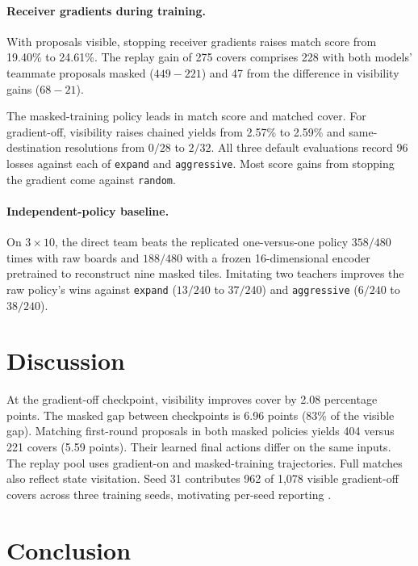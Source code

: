 \documentclass{article}
\begin{document}
\paragraph{Receiver gradients during training.}
With proposals visible, stopping receiver gradients raises match score from 19.40\% to 24.61\%. The replay gain of 275 covers comprises 228 with both models' teammate proposals masked (\(449-221\)) and 47 from the difference in visibility gains (\(68-21\)).

The masked-training policy leads in match score and matched cover. For gradient-off, visibility raises chained yields from 2.57\% to 2.59\% and same-destination resolutions from \(0/28\) to \(2/32\). All three default evaluations record 96 losses against each of \texttt{expand} and \texttt{aggressive}. Most score gains from stopping the gradient come against \texttt{random}.

\begin{samepage}
\paragraph{Independent-policy baseline.}
On \(3\times10\), the direct team beats the replicated one-versus-one policy \(358/480\) times with raw boards and \(188/480\) with a frozen 16-dimensional encoder pretrained to reconstruct nine masked tiles. Imitating two teachers improves the raw policy's wins against \texttt{expand} (\(13/240\) to \(37/240\)) and \texttt{aggressive} (\(6/240\) to \(38/240\)).

\end{samepage}

\section{Discussion}

At the gradient-off checkpoint, visibility improves cover by 2.08 percentage points. The masked gap between checkpoints is 6.96 points (83\% of the visible gap). Matching first-round proposals in both masked policies yields 404 versus 221 covers (5.59 points). Their learned final actions differ on the same inputs. The replay pool uses gradient-on and masked-training trajectories. Full matches also reflect state visitation. Seed 31 contributes 962 of 1,078 visible gradient-off covers across three training seeds, motivating per-seed reporting \citep{agarwal2021precipice}.

\section{Conclusion}
\end{document}
